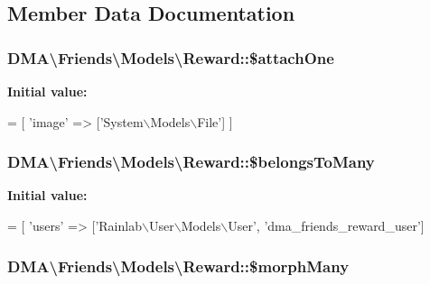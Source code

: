 \subsection{Member Data Documentation}
\hypertarget{classDMA_1_1Friends_1_1Models_1_1Reward_ab1843b31c74161b3adcb02c7be7e9556}{
\subsubsection[{\$attach\+One}]{\setlength{\rightskip}{0pt plus 5cm}D\+M\+A\textbackslash{}\+Friends\textbackslash{}\+Models\textbackslash{}\+Reward\+::\$attach\+One}}\label{classDMA_1_1Friends_1_1Models_1_1Reward_ab1843b31c74161b3adcb02c7be7e9556}
{\bfseries Initial value\+:}
\begin{DoxyCode}
= [
        \textcolor{stringliteral}{'image'} => [\textcolor{stringliteral}{'System\(\backslash\)Models\(\backslash\)File'}]
    ]
\end{DoxyCode}
\hypertarget{classDMA_1_1Friends_1_1Models_1_1Reward_a4562d55136961af6257eac8242bc77a1}{
\subsubsection[{\$belongs\+To\+Many}]{\setlength{\rightskip}{0pt plus 5cm}D\+M\+A\textbackslash{}\+Friends\textbackslash{}\+Models\textbackslash{}\+Reward\+::\$belongs\+To\+Many}}\label{classDMA_1_1Friends_1_1Models_1_1Reward_a4562d55136961af6257eac8242bc77a1}
{\bfseries Initial value\+:}
\begin{DoxyCode}
= [
        \textcolor{stringliteral}{'users'} => [\textcolor{stringliteral}{'Rainlab\(\backslash\)User\(\backslash\)Models\(\backslash\)User'}, \textcolor{stringliteral}{'dma\_friends\_reward\_user'}]
\end{DoxyCode}
\hypertarget{classDMA_1_1Friends_1_1Models_1_1Reward_a471e1042553519781408b0ebe6133397}{
\subsubsection[{\$morph\+Many}]{\setlength{\rightskip}{0pt plus 5cm}D\+M\+A\textbackslash{}\+Friends\textbackslash{}\+Models\textbackslash{}\+Reward\+::\$morph\+Many}}\label{classDMA_1_1Friends_1_1Models_1_1Reward_a471e1042553519781408b0ebe6133397}
